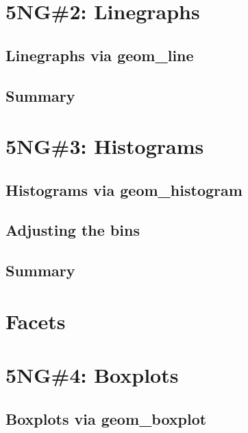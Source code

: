 \documentclass[
  12pt, krantz2,
]{krantz}
\begin{document}
\hypertarget{linegraphs}{%
\section{5NG\#2: Linegraphs}\label{linegraphs}}

\hypertarget{geomline}{%
\subsection{Linegraphs via geom\_line}\label{geomline}}

\hypertarget{summary-1}{%
\subsection{Summary}\label{summary-1}}

\hypertarget{histograms}{%
\section{5NG\#3: Histograms}\label{histograms}}

\hypertarget{geomhistogram}{%
\subsection{Histograms via geom\_histogram}\label{geomhistogram}}

\hypertarget{adjustbins}{%
\subsection{Adjusting the bins}\label{adjustbins}}

\hypertarget{summary-2}{%
\subsection{Summary}\label{summary-2}}

\hypertarget{facets}{%
\section{Facets}\label{facets}}

\hypertarget{boxplots}{%
\section{5NG\#4: Boxplots}\label{boxplots}}

\hypertarget{geomboxplot}{%
\subsection{Boxplots via geom\_boxplot}\label{geomboxplot}}
\end{document}

